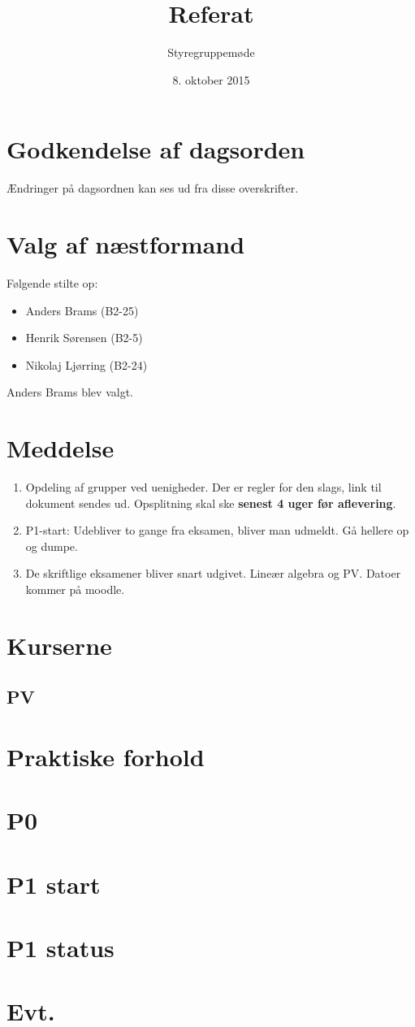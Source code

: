 \documentclass[hidelinks, 12pt]{article}
\begin{document}
	
	\title{Referat}
	\author{Styregruppemøde}
	\date{8. oktober 2015}
	\maketitle
	
	\section{Godkendelse af dagsorden}
	Ændringer på dagsordnen kan ses ud fra disse overskrifter.
	\section{Valg af næstformand}
	Følgende stilte op:
	\begin{itemize}
		\item Anders Brams (B2-25)
		\item Henrik Sørensen (B2-5)
		\item Nikolaj Ljørring (B2-24)
	\end{itemize}
	
	Anders Brams blev valgt.

	\section{Meddelse}
	\begin{enumerate}
		\item Opdeling af grupper ved uenigheder. Der er regler for den slags, link til dokument sendes ud. Opsplitning skal ske \textbf{senest 4 uger før aflevering}.
		\item P1-start: Udebliver to gange fra eksamen, bliver man udmeldt. Gå hellere op og dumpe.
		\item De skriftlige eksamener bliver snart udgivet. Lineær algebra og PV. Datoer kommer på moodle.
	\end{enumerate}

	\section{Kurserne}
	\subsection{PV}

	\section{Praktiske forhold}

	\section{P0}

	\section{P1 start}

	\section{P1 status}

	\section{Evt.}
\end{document}
